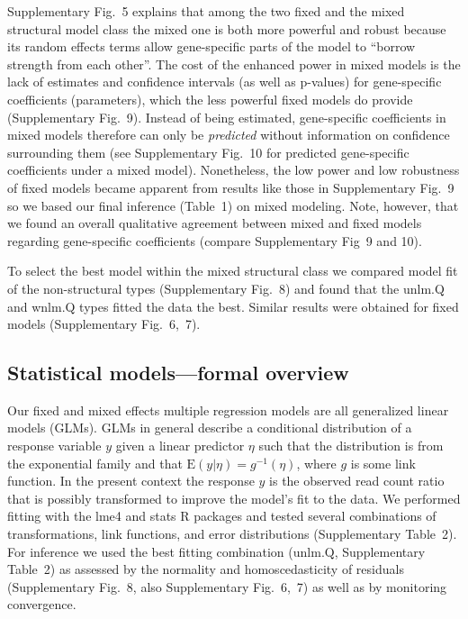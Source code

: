 \documentclass[letterpaper]{article}
\begin{document}
Supplementary Fig.~5 explains that among the two fixed and the mixed
structural model class the mixed one is both more powerful and robust because
its random effects terms allow gene-specific parts of the model to ``borrow
strength from each other''.  The cost of the enhanced power in mixed models is
the lack of estimates and confidence intervals (as well as p-values) for
gene-specific coefficients (parameters), which the less powerful fixed models
do provide (Supplementary Fig.~9).  Instead of being estimated,
gene-specific coefficients in mixed models therefore can only be
\emph{predicted} without information on confidence surrounding them (see
Supplementary Fig.~10 for predicted gene-specific coefficients under a
mixed model).  Nonetheless, the low power and low robustness of fixed models
became apparent from results like those in Supplementary Fig.~9 so
we based our final inference (Table~1) on mixed modeling.
Note, however, that we found an overall qualitative agreement between mixed and
fixed models regarding gene-specific coefficients (compare
Supplementary Fig~9 and 10).

To select the best model within the mixed structural class we compared model
fit of the non-structural types (Supplementary Fig.~8) and found
that the unlm.Q and wnlm.Q types fitted the data the best.  Similar results
were obtained for fixed models
(Supplementary Fig.~6,~7).

\subsection*{Statistical models---formal overview}
\label{sec:regression-overview-formal}

Our fixed and mixed effects multiple regression models are all generalized
linear models (GLMs).  GLMs in general describe a conditional distribution of
a response variable \(y\) given a linear predictor \(\eta\) such that the
distribution is from the exponential family and that \(\mathrm{E}(y|\eta) =
g^{-1} (\eta)\), where \(g\) is some link function.  In the present context
the response \(y\) is the observed read count ratio that is possibly
transformed to improve the model's fit to the data.  We performed fitting with
the lme4 and stats R packages and tested several combinations of
transformations, link functions, and error distributions
(Supplementary Table~2).  For inference we used the best fitting
combination (\(\mathrm{unlm.Q}\), Supplementary Table~2) as assessed by
the normality and homoscedasticity of residuals (Supplementary Fig.~8,
also Supplementary Fig.~6,~7) as well
as by monitoring convergence.
\end{document}
